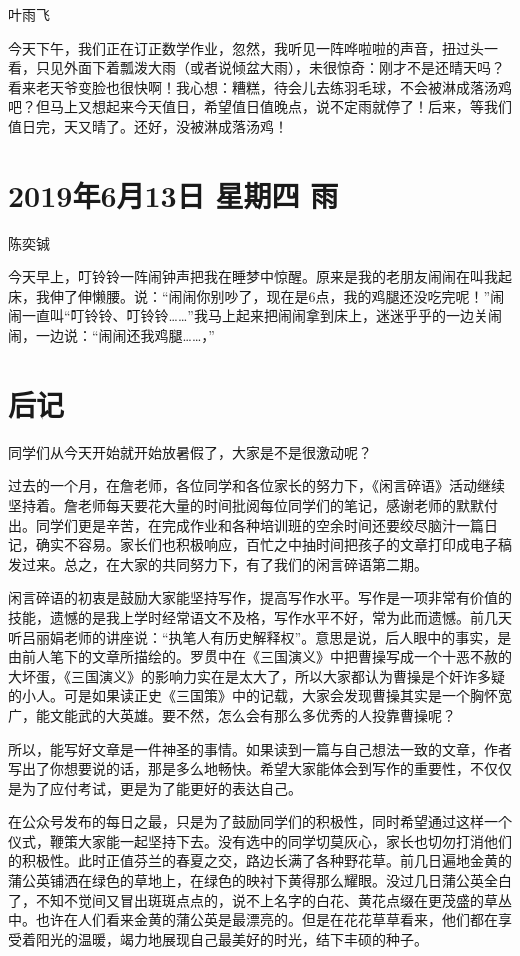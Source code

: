 叶雨飞

今天下午，我们正在订正数学作业，忽然，我听见一阵哗啦啦的声音，扭过头一看，只见外面下着瓢泼大雨（或者说倾盆大雨），未很惊奇：刚才不是还晴天吗？看来老天爷变脸也很快啊！我心想：糟糕，待会儿去练羽毛球，不会被淋成落汤鸡吧？但马上又想起来今天值日，希望值日值晚点，说不定雨就停了！后来，等我们值日完，天又晴了。还好，没被淋成落汤鸡！

\section{2019年6月13日 星期四 雨}

陈奕铖

今天早上，叮铃铃一阵闹钟声把我在睡梦中惊醒。原来是我的老朋友闹闹在叫我起床，我伸了伸懒腰。说：``闹闹你别吵了，现在是6点，我的鸡腿还没吃完呢！''闹闹一直叫``叮铃铃、叮铃铃\ldots{}\ldots{}''我马上起来把闹闹拿到床上，迷迷乎乎的一边关闹闹，一边说：``闹闹还我鸡腿\ldots{}\ldots{}，''

\section{后记}

同学们从今天开始就开始放暑假了，大家是不是很激动呢？

过去的一个月，在詹老师，各位同学和各位家长的努力下，《闲言碎语》活动继续坚持着。詹老师每天要花大量的时间批阅每位同学们的笔记，感谢老师的默默付出。同学们更是辛苦，在完成作业和各种培训班的空余时间还要绞尽脑汁一篇日记，确实不容易。家长们也积极响应，百忙之中抽时间把孩子的文章打印成电子稿发过来。总之，在大家的共同努力下，有了我们的闲言碎语第二期。

闲言碎语的初衷是鼓励大家能坚持写作，提高写作水平。写作是一项非常有价值的技能，遗憾的是我上学时经常语文不及格，写作水平不好，常为此而遗憾。前几天听吕丽娟老师的讲座说：“执笔人有历史解释权”。意思是说，后人眼中的事实，是由前人笔下的文章所描绘的。罗贯中在《三国演义》中把曹操写成一个十恶不赦的大坏蛋，《三国演义》的影响力实在是太大了，所以大家都认为曹操是个奸诈多疑的小人。可是如果读正史《三国策》中的记载，大家会发现曹操其实是一个胸怀宽广，能文能武的大英雄。要不然，怎么会有那么多优秀的人投靠曹操呢？

所以，能写好文章是一件神圣的事情。如果读到一篇与自己想法一致的文章，作者写出了你想要说的话，那是多么地畅快。希望大家能体会到写作的重要性，不仅仅是为了应付考试，更是为了能更好的表达自己。

在公众号发布的每日之最，只是为了鼓励同学们的积极性，同时希望通过这样一个仪式，鞭策大家能一起坚持下去。没有选中的同学切莫灰心，家长也切勿打消他们的积极性。此时正值芬兰的春夏之交，路边长满了各种野花草。前几日遍地金黄的蒲公英铺洒在绿色的草地上，在绿色的映衬下黄得那么耀眼。没过几日蒲公英全白了，不知不觉间又冒出斑斑点点的，说不上名字的白花、黄花点缀在更茂盛的草丛中。也许在人们看来金黄的蒲公英是最漂亮的。但是在花花草草看来，他们都在享受着阳光的温暖，竭力地展现自己最美好的时光，结下丰硕的种子。

